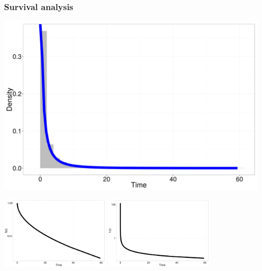 \documentclass{beamer}
\begin{document}
\begin{frame}
  \frametitle{Survival analysis}

  \begin{center}
    \includegraphics[height = 0.5\textheight, width = \textwidth, keepaspectratio = true]{figure/dur_dec}

    \includegraphics[height = 0.5\textheight, width = 0.4\textwidth, keepaspectratio = true]{figure/sur_dec}
    \includegraphics[height = 0.5\textheight, width = 0.4\textwidth, keepaspectratio = true]{figure/haz_dec}
  \end{center}
\end{frame}
\end{document}
